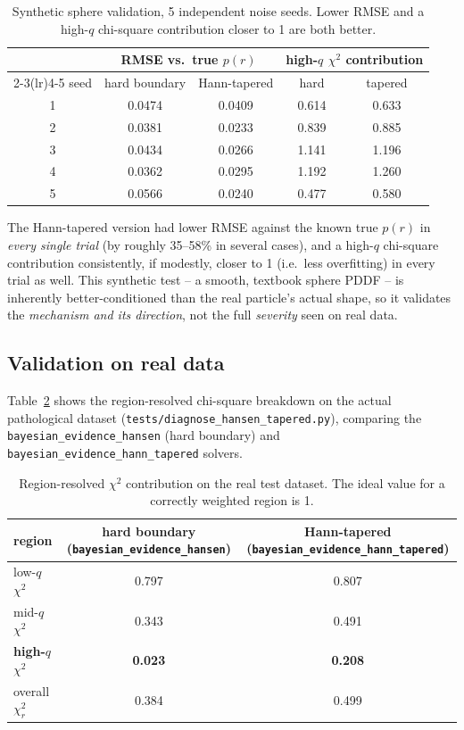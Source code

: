 \documentclass[11pt,a4paper]{article}
\begin{document}
\begin{table}[h]
\centering
\caption{Synthetic sphere validation, 5 independent noise seeds.
Lower RMSE and a high-$q$ chi-square contribution closer to 1 are both
better.}
\label{tab:synth}
\begin{tabular}{@{}c c c c c@{}}
\toprule
 & \multicolumn{2}{c}{RMSE vs.\ true $p(r)$} & \multicolumn{2}{c}{high-$q$ $\chi^2$ contribution} \\
\cmidrule(lr){2-3}\cmidrule(lr){4-5}
seed & hard boundary & Hann-tapered & hard & tapered \\
\midrule
1 & 0.0474 & 0.0409 & 0.614 & 0.633 \\
2 & 0.0381 & 0.0233 & 0.839 & 0.885 \\
3 & 0.0434 & 0.0266 & 1.141 & 1.196 \\
4 & 0.0362 & 0.0295 & 1.192 & 1.260 \\
5 & 0.0566 & 0.0240 & 0.477 & 0.580 \\
\bottomrule
\end{tabular}
\end{table}

The Hann-tapered version had lower RMSE against the known true $p(r)$
in \emph{every single trial} (by roughly 35--58\% in several cases),
and a high-$q$ chi-square contribution consistently, if modestly,
closer to 1 (i.e.\ less overfitting) in every trial as well. This
synthetic test -- a smooth, textbook sphere PDDF -- is inherently
better-conditioned than the real particle's actual shape, so it
validates the \emph{mechanism and its direction}, not the full
\emph{severity} seen on real data.

\subsection{Validation on real data}

Table~\ref{tab:real} shows the region-resolved chi-square breakdown on
the actual pathological dataset
(\texttt{tests/diagnose\_hansen\_tapered.py}), comparing the
\texttt{bayesian\_evidence\_hansen} (hard boundary) and
\texttt{bayesian\_evidence\_hann\_tapered} solvers.

\begin{table}[h]
\centering
\caption{Region-resolved $\chi^2$ contribution on the real test
dataset. The ideal value for a correctly weighted region is 1.}
\label{tab:real}
\begin{tabular}{@{}lcc@{}}
\toprule
region & hard boundary (\texttt{bayesian\_evidence\_hansen}) &
  Hann-tapered (\texttt{bayesian\_evidence\_hann\_tapered}) \\
\midrule
low-$q$ $\chi^2$  & 0.797 & 0.807 \\
mid-$q$ $\chi^2$  & 0.343 & 0.491 \\
\textbf{high-$q$ $\chi^2$} & \textbf{0.023} & \textbf{0.208} \\
\midrule
overall $\chi^2_r$ & 0.384 & 0.499 \\
\bottomrule
\end{tabular}
\end{table}
\end{document}
